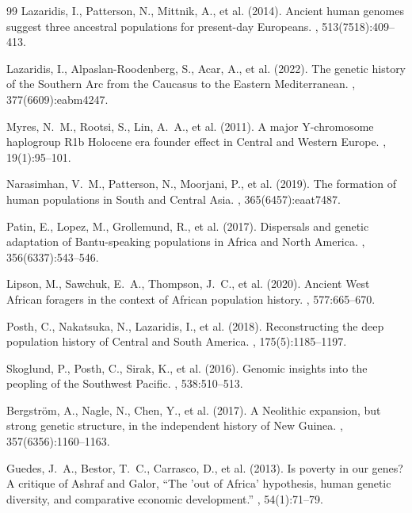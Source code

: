 \documentclass[11pt,letterpaper]{article}
\begin{document}
\begin{thebibliography}{99}
Lazaridis, I., Patterson, N., Mittnik, A., et al. (2014).
\newblock Ancient human genomes suggest three ancestral populations for present-day Europeans.
, 513(7518):409--413.

Lazaridis, I., Alpaslan-Roodenberg, S., Acar, A., et al. (2022).
\newblock The genetic history of the Southern Arc from the Caucasus to the Eastern Mediterranean.
, 377(6609):eabm4247.

Myres, N.~M., Rootsi, S., Lin, A.~A., et al. (2011).
\newblock A major Y-chromosome haplogroup R1b Holocene era founder effect in Central and Western Europe.
, 19(1):95--101.

Narasimhan, V.~M., Patterson, N., Moorjani, P., et al. (2019).
\newblock The formation of human populations in South and Central Asia.
, 365(6457):eaat7487.

Patin, E., Lopez, M., Grollemund, R., et al. (2017).
\newblock Dispersals and genetic adaptation of Bantu-speaking populations in Africa and North America.
, 356(6337):543--546.

Lipson, M., Sawchuk, E.~A., Thompson, J.~C., et al. (2020).
\newblock Ancient West African foragers in the context of African population history.
, 577:665--670.

Posth, C., Nakatsuka, N., Lazaridis, I., et al. (2018).
\newblock Reconstructing the deep population history of Central and South America.
, 175(5):1185--1197.

Skoglund, P., Posth, C., Sirak, K., et al. (2016).
\newblock Genomic insights into the peopling of the Southwest Pacific.
, 538:510--513.

Bergstr\"om, A., Nagle, N., Chen, Y., et al. (2017).
\newblock A Neolithic expansion, but strong genetic structure, in the independent history of New Guinea.
, 357(6356):1160--1163.

Guedes, J.~A., Bestor, T.~C., Carrasco, D., et al. (2013).
\newblock Is poverty in our genes? A critique of Ashraf and Galor, ``The 'out of Africa' hypothesis, human genetic diversity, and comparative economic development.''
, 54(1):71--79.


\end{thebibliography}
\end{document}
